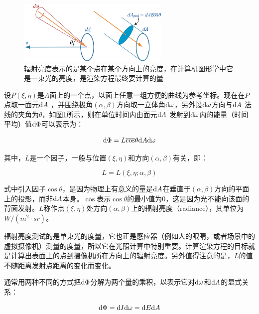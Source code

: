 \begin{figure}
\sidecaption
	\includegraphics[width=0.65\textwidth]{figures/intro/radiance}
	\caption{辐射亮度表示的是某个点在某个方向上的亮度，在计算机图形学中它是一束光的亮度，是渲染方程最终要计算的量}
	\label{f:intro-radiance}
\end{figure}

设$P(\xi,\eta)$是$A$面上的一个点，以面上任意一组方便的曲线为参考坐标。现在在$P$点取一面元${\rm d}A$ ，并围绕极角$(\alpha,\beta)$方向取一立体角${\rm d}\omega$，另外设${\rm d}\omega$方向与${\rm d}A$ 法线的夹角为$\theta$，如图\ref{f:intro-radiance}所示，则在单位时间内由面元${\rm d}A$ 发射到${\rm d}\omega$内的能量（时间平均）值${\rm d}\Phi$可以表示为：

\begin{equation}\label{eq:intro-energy}
	{\rm d}\Phi=L\overline{\cos}\theta {\rm d}A {\rm d}\omega
\end{equation}

\noindent 其中，$L$是一个因子，一般与位置$(\xi,\eta)$和方向$(\alpha,\beta)$有关，即：

\begin{equation}
	L=L(\xi,\eta;\alpha,\beta)
\end{equation}

\noindent 式中引入因子$\cos\theta$，是因为物理上有意义的量是${\rm d}A$在垂直于$(\alpha,\beta)$方向的平面上的投影，而非${\rm d}A$本身。$\overline{\cos}$表示$\cos\theta$的最小值为$0$，这是因为光不能向该面的背面发射。$L$称作点$(\xi,\eta)$处方向$(\alpha,\beta)$上的辐射亮度（radiance），其单位为$W/(m^2\cdot sr)$。

辐射亮度测试的是单束光的度量，它也正是感应器（例如人的眼睛，或者场景中的虚拟摄像机）测量的度量，所以它在光照计算中特别重要。计算渲染方程的目标就是计算出表面上的点到摄像机所在方向上的辐射亮度。另外值得注意的是，$L$的值不随距离发射点距离的变化而变化。

通常用两种不同的方式把${\rm d}\Phi$分解为两个量的乘积，以表示它对${\rm d}\omega$和${\rm d} A$的显式关系：

\begin{equation}\label{eq:intro-energy-1}
	{\rm d}\Phi={\rm d}I {\rm d}\omega={\rm d}E {\rm d}A
\end{equation}

